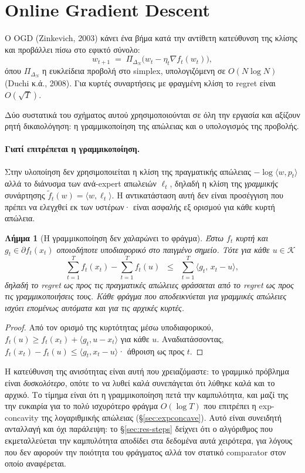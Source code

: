\documentclass[12pt,a4paper,oneside]{report}
\renewcommand{\_}{\oldunderscore\allowbreak}
\theoremstyle{definition}
\theoremstyle{plain}
\newtheorem{lemma}[theorem]{Λήμμα}
\theoremstyle{remark}
\begin{document}
\section{Online Gradient Descent}

Ο OGD (Zinkevich, 2003) κάνει ένα βήμα κατά την αντίθετη κατεύθυνση της κλίσης και προβάλλει
πίσω στο εφικτό σύνολο:
\[
w_{t+1} \;=\; \Pi_{\Delta_N}\!\big(w_t - \eta_t \nabla f_t(w_t)\big),
\]
όπου $\Pi_{\Delta_N}$ η ευκλείδεια προβολή στο simplex, υπολογιζόμενη σε $O(N \log N)$
(Duchi κ.ά., 2008). Για κυρτές συναρτήσεις με φραγμένη κλίση το regret είναι $O(\sqrt{T})$.

Δύο συστατικά του σχήματος αυτού χρησιμοποιούνται σε όλη την εργασία και αξίζουν ρητή
δικαιολόγηση: η γραμμικοποίηση της απώλειας και ο υπολογισμός της προβολής.

\paragraph{Γιατί επιτρέπεται η γραμμικοποίηση.} Στην υλοποίηση δεν χρησιμοποιείται η κλίση
της πραγματικής απώλειας $-\log\langle w, p_t\rangle$ αλλά το διάνυσμα των ανά-expert
απωλειών $\ell_t$, δηλαδή η κλίση της \emph{γραμμικής} συνάρτησης
$\tilde{f}_t(w) = \langle w, \ell_t\rangle$. Η αντικατάσταση αυτή δεν είναι προσέγγιση που
πρέπει να ελεγχθεί εκ των υστέρων· είναι ασφαλής εξ ορισμού για κάθε κυρτή απώλεια.

\begin{lemma}[Η γραμμικοποίηση δεν χαλαρώνει το φράγμα]
\label{lem:linearization}
Έστω $f_t$ κυρτή και $g_t \in \partial f_t(x_t)$ οποιοδήποτε υποδιαφορικό στο παιγμένο σημείο.
Τότε για κάθε $u \in \mathcal{K}$
\[
\sum_{t=1}^{T} f_t(x_t) - \sum_{t=1}^{T} f_t(u) \;\;\leq\;\; \sum_{t=1}^{T} \langle g_t,\, x_t - u\rangle,
\]
δηλαδή το regret ως προς τις πραγματικές απώλειες φράσσεται από το regret ως προς τις
γραμμικοποιήσεις τους. Κάθε φράγμα που αποδεικνύεται για γραμμικές απώλειες ισχύει επομένως
αυτόματα και για τις αρχικές κυρτές.
\end{lemma}

\begin{proof}
Από τον ορισμό της κυρτότητας μέσω υποδιαφορικού, $f_t(u) \geq f_t(x_t) + \langle g_t, u-x_t
\rangle$ για κάθε $u$. Αναδιατάσσοντας, $f_t(x_t) - f_t(u) \leq \langle g_t, x_t-u\rangle$·
άθροιση ως προς $t$.
\end{proof}

Η κατεύθυνση της ανισότητας είναι αυτή που χρειαζόμαστε: το γραμμικό πρόβλημα είναι
\emph{δυσκολότερο}, οπότε το να λυθεί καλά συνεπάγεται ότι λύθηκε καλά και το αρχικό. Το
τίμημα είναι ότι η γραμμικοποίηση πετά την καμπυλότητα, και μαζί της την ευκαιρία για το
πολύ ισχυρότερο φράγμα $O(\log T)$ που επιτρέπει η exp-concavity της λογαριθμικής απώλειας
(\S\ref{sec:expconcave}). Αυτό είναι συνειδητή ανταλλαγή και όχι παράλειψη: το
\S\ref{sec:res-steps} δείχνει ότι ο αλγόριθμος που εκμεταλλεύεται την καμπυλότητα αποδίδει
στα δεδομένα αυτά χειρότερα, για λόγους που δεν αφορούν την ποιότητα του φράγματος αλλά τον
στατικό comparator στον οποίο αναφέρεται.
\end{document}
